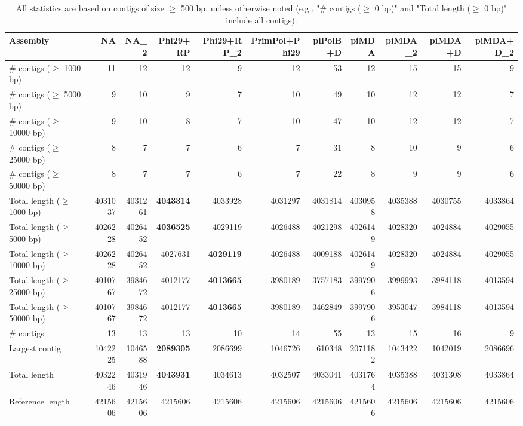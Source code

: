 \documentclass[12pt,a4paper]{article}
\begin{document}
\begin{table}[ht]
\begin{center}
\caption{All statistics are based on contigs of size $\geq$ 500 bp, unless otherwise noted (e.g., "\# contigs ($\geq$ 0 bp)" and "Total length ($\geq$ 0 bp)" include all contigs).}
\begin{tabular}{|l*{10}{|r}|}
\hline
Assembly & NA & NA\_2 & Phi29+RP & Phi29+RP\_2 & PrimPol+Phi29 & piPolB+D & piMDA & piMDA\_2 & piMDA+D & piMDA+D\_2 \\ \hline
\# contigs ($\geq$ 1000 bp) & 11 & 12 & 12 & 9 & 12 & 53 & 12 & 15 & 15 & 9 \\ \hline
\# contigs ($\geq$ 5000 bp) & 9 & 10 & 9 & 7 & 10 & 49 & 10 & 12 & 12 & 7 \\ \hline
\# contigs ($\geq$ 10000 bp) & 9 & 10 & 8 & 7 & 10 & 47 & 10 & 12 & 12 & 7 \\ \hline
\# contigs ($\geq$ 25000 bp) & 8 & 7 & 7 & 6 & 7 & 31 & 8 & 10 & 9 & 6 \\ \hline
\# contigs ($\geq$ 50000 bp) & 8 & 7 & 7 & 6 & 7 & 22 & 8 & 9 & 9 & 6 \\ \hline
Total length ($\geq$ 1000 bp) & 4031037 & 4031261 & {\bf 4043314} & 4033928 & 4031297 & 4031814 & 4030958 & 4035388 & 4030755 & 4033864 \\ \hline
Total length ($\geq$ 5000 bp) & 4026228 & 4026452 & {\bf 4036525} & 4029119 & 4026488 & 4021298 & 4026149 & 4028320 & 4024884 & 4029055 \\ \hline
Total length ($\geq$ 10000 bp) & 4026228 & 4026452 & 4027631 & {\bf 4029119} & 4026488 & 4009188 & 4026149 & 4028320 & 4024884 & 4029055 \\ \hline
Total length ($\geq$ 25000 bp) & 4010767 & 3984672 & 4012177 & {\bf 4013665} & 3980189 & 3757183 & 3997906 & 3999993 & 3984118 & 4013594 \\ \hline
Total length ($\geq$ 50000 bp) & 4010767 & 3984672 & 4012177 & {\bf 4013665} & 3980189 & 3462849 & 3997906 & 3953047 & 3984118 & 4013594 \\ \hline
\# contigs & 13 & 13 & 13 & 10 & 14 & 55 & 13 & 15 & 16 & 9 \\ \hline
Largest contig & 1042225 & 1046588 & {\bf 2089305} & 2086699 & 1046726 & 610348 & 2071182 & 1043422 & 1042019 & 2086696 \\ \hline
Total length & 4032246 & 4031946 & {\bf 4043931} & 4034613 & 4032507 & 4033041 & 4031764 & 4035388 & 4031308 & 4033864 \\ \hline
Reference length & 4215606 & 4215606 & 4215606 & 4215606 & 4215606 & 4215606 & 4215606 & 4215606 & 4215606 & 4215606 \\ \hline

\end{tabular}
\end{center}
\end{table}
\end{document}
